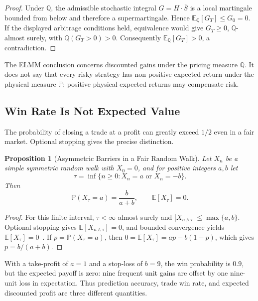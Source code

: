 \documentclass[aps,pra,reprint,superscriptaddress,amsmath,amssymb,floatfix]{revtex4-2}
\theoremstyle{plain}
\newtheorem{proposition}[theorem]{Proposition}
\theoremstyle{definition}
\theoremstyle{remark}
\begin{document}
\begin{proof}
Under \(\mathbb{Q}\), the admissible stochastic integral
\(G=H\mathbin{\cdot}\overline S\) is a local martingale bounded from below and
therefore a supermartingale. Hence
\(\mathbb{E}_{\mathbb{Q}}[G_T]\leq G_0=0\). If the displayed arbitrage
conditions held, equivalence would give \(G_T\geq0\),
\(\mathbb{Q}\)-almost surely, with
\(\mathbb{Q}(G_T>0)>0\). Consequently
\(\mathbb{E}_{\mathbb{Q}}[G_T]>0\), a contradiction.
\end{proof}

The ELMM conclusion concerns discounted gains under the pricing measure
\(\mathbb{Q}\). It does not say that every risky strategy has non-positive
expected return under the physical measure \(\mathbb{P}\); positive physical
expected returns may compensate risk.

\subsection{Win Rate Is Not Expected Value}

The probability of closing a trade at a profit can greatly exceed \(1/2\)
even in a fair market. Optional stopping gives the precise distinction.

\begin{proposition}[Asymmetric Barriers in a Fair Random Walk]
  \label{prop:optional}
  Let \(X_n\) be a simple symmetric random walk with \(X_0=0\), and for positive
  integers \(a,b\) let
  \[
    \tau=\inf\{n\geq0:X_n=a\text{ or }X_n=-b\}.
  \]
  Then
  \begin{equation}
    \mathbb{P}(X_\tau=a)=\frac{b}{a+b},
    \qquad
    \mathbb{E}[X_\tau]=0.
    \label{eq:gambler}
  \end{equation}
\end{proposition}

\begin{proof}
For this finite interval, \(\tau<\infty\) almost surely and
\(|X_{n\wedge\tau}|\leq\max\{a,b\}\). Optional stopping gives
\(\mathbb E[X_{n\wedge\tau}]=0\), and bounded convergence yields
\(\mathbb E[X_\tau]=0\)~\cite{Doob1953}. If
\(p=\mathbb{P}(X_\tau=a)\), then
\(0=\mathbb{E}[X_\tau]=ap-b(1-p)\), which gives
\(p=b/(a+b)\).
\end{proof}

With a take-profit of \(a=1\) and a stop-loss of \(b=9\), the win probability
is \(0.9\), but the expected payoff is zero: nine frequent unit gains are
offset by one nine-unit loss in expectation. Thus prediction accuracy, trade
win rate, and expected discounted profit are three different quantities.
\end{document}
